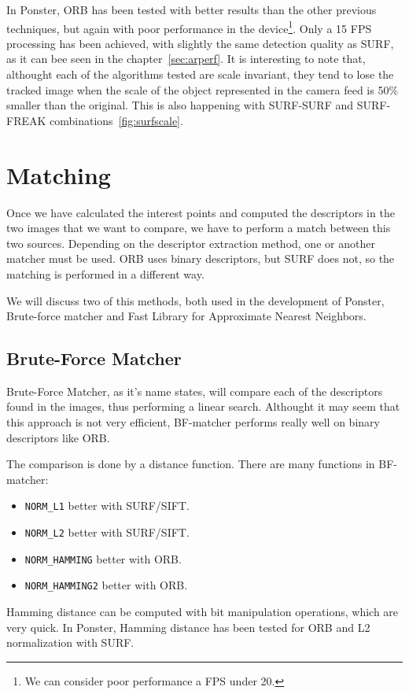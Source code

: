 In Ponster, ORB has been tested with better results than the other previous
techniques, but again with poor performance in the device\footnote{We can
  consider poor performance a FPS under 20.}. Only a 15 FPS
processing has been achieved, with slightly the same detection quality as
SURF, as it can bee seen in the chapter~\ref{sec:arperf}. It is interesting to
note that, althought each of the algorithms tested 
are scale invariant, they tend to lose the tracked image when the scale of the object
represented in the camera feed is 50\% smaller than the original. This is also
happening with SURF-SURF and SURF-FREAK combinations~\ref{fig:surfscale}.

\section{Matching}
Once we have calculated the interest points and computed the descriptors in the
two images that we want to compare, we have to perform a match between this two
sources. Depending on the descriptor extraction method, one or another matcher
must be used. ORB uses binary descriptors, but SURF does not, so the matching
is performed in a different way.

We will discuss two of this methods, both used in the development of Ponster,
Brute-force matcher and Fast Library for Approximate Nearest Neighbors. 

\subsection{Brute-Force Matcher}
Brute-Force Matcher, as it's name states, will compare each of the descriptors
found in the images, thus performing a linear search. Althought it may seem that
this approach is not very efficient, BF-matcher performs really well on binary
descriptors like ORB. 

The comparison is done by a distance function. There are many functions in
BF-matcher:
\begin{itemize}
\item \texttt{NORM\_L1} better with SURF/SIFT.
\item \texttt{NORM\_L2} better with SURF/SIFT.
\item \texttt{NORM\_HAMMING} better with ORB.
\item \texttt{NORM\_HAMMING2} better with ORB.
\end{itemize}
Hamming distance can be computed with bit manipulation operations, which are
very quick. In Ponster, Hamming distance has been tested for ORB and L2
normalization with SURF. 

